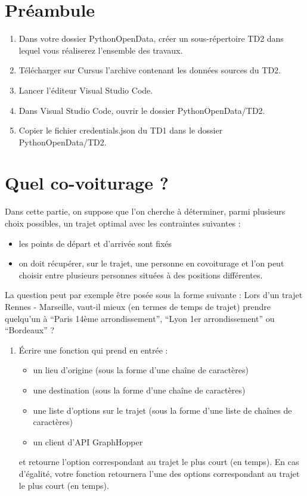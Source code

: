 \documentclass[11pt,a4paper]{article}
\begin{document}
\section*{Préambule}
\begin{enumerate}
    \item Dans votre dossier PythonOpenData, créer un sous-répertoire TD2 dans lequel vous réaliserez l'ensemble des travaux. 
    \item Télécharger sur Cursus l'archive contenant les données sources du TD2.
    \item Lancer l'éditeur Visual Studio Code.
    \item Dans Visual Studio Code, ouvrir le dossier PythonOpenData/TD2. 
    \item Copier le fichier credentials.json du TD1 dans le dossier PythonOpenData/TD2.
\end{enumerate}



\section{Quel co-voiturage ?}

Dans cette partie, on suppose que l’on cherche à déterminer, parmi plusieurs choix possibles, un trajet optimal avec les contraintes suivantes :
\begin{itemize}
    \item les points de départ et d’arrivée sont fixés
    \item on doit récupérer, sur le trajet, une personne en covoiturage et l’on peut choisir entre plusieurs personnes situées à des positions différentes.
\end{itemize}

La question peut par exemple être posée sous la forme suivante : \og 
    Lors d’un trajet Rennes - Marseille, vaut-il mieux (en termes de temps de trajet) prendre quelqu’un à “Paris 14ème arrondissement”, “Lyon 1er arrondissement” ou “Bordeaux” ? \fg

\begin{enumerate}
    \item Écrire une fonction qui prend en entrée :
    \begin{itemize}
        \item un lieu d’origine (sous la forme d’une chaîne de caractères)
        \item une destination (sous la forme d’une chaîne de caractères)
        \item une liste d’options sur le trajet (sous la forme d’une liste de chaînes de caractères)
        \item un client d’API GraphHopper
    \end{itemize}
    et retourne l’option correspondant au trajet le plus court (en temps). En cas d’égalité, votre fonction retournera l’une des options correspondant au trajet le plus court (en temps).

\end{enumerate}
\end{document}
